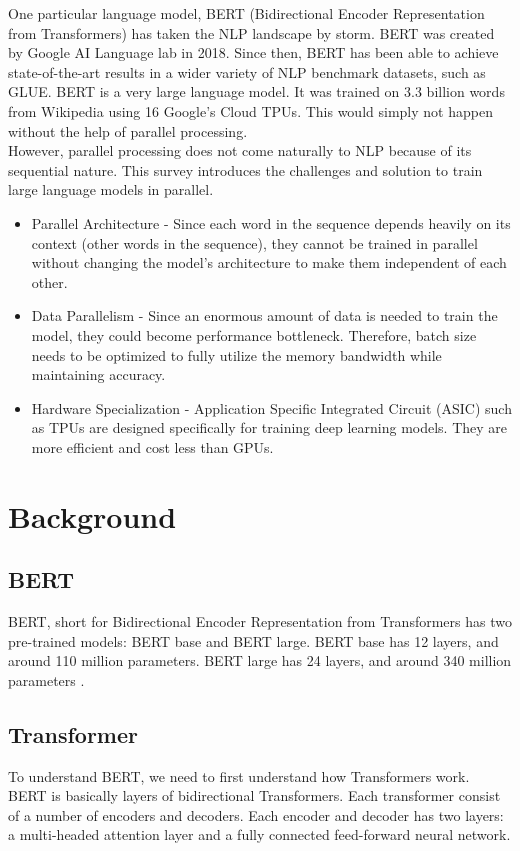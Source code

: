 \documentclass[conference]{IEEEtran}
\begin{document}
One particular language model, BERT (Bidirectional Encoder Representation from Transformers) \cite{BERT} has taken the NLP landscape by storm. BERT was created by Google AI Language lab in 2018. Since then, BERT has been able to achieve state-of-the-art results in a wider variety of NLP benchmark datasets, such as GLUE\cite{glue}. BERT is a very large language model. It was trained on 3.3 billion words from Wikipedia using 16 Google's Cloud TPUs. This would simply not happen without the help of parallel processing.\\

However, parallel processing does not come naturally to NLP because of its sequential nature. This survey introduces the challenges and solution to train large language models in parallel.\\

\begin{itemize}
	\item Parallel Architecture - Since each word in the sequence depends heavily on its context (other words in the sequence), they cannot be trained in parallel without changing the model's architecture to make them independent of each other.
	\item Data Parallelism - Since an enormous amount of data is needed to train the model, they could become performance bottleneck. Therefore,  batch size needs to be optimized to fully utilize the memory bandwidth while maintaining accuracy.
	\item Hardware Specialization - Application Specific Integrated Circuit (ASIC) such as TPUs are designed specifically for training deep learning models. They are more efficient and cost less than GPUs.
\end{itemize}

\section{Background} 
	\subsection{BERT}
	BERT, short for Bidirectional Encoder Representation from Transformers has two pre-trained models: BERT base and BERT large. BERT base has 12 layers, and around 110 million parameters. BERT large has 24 layers, and around 340 million parameters \cite{BERT}.\\
	
	\subsection{Transformer}
	To understand BERT, we need to first understand how Transformers work. BERT is basically layers of bidirectional Transformers. Each transformer consist of a number of encoders and decoders. Each encoder and decoder has two layers: a multi-headed attention layer and a fully connected feed-forward neural network.\\
	
\end{document}
